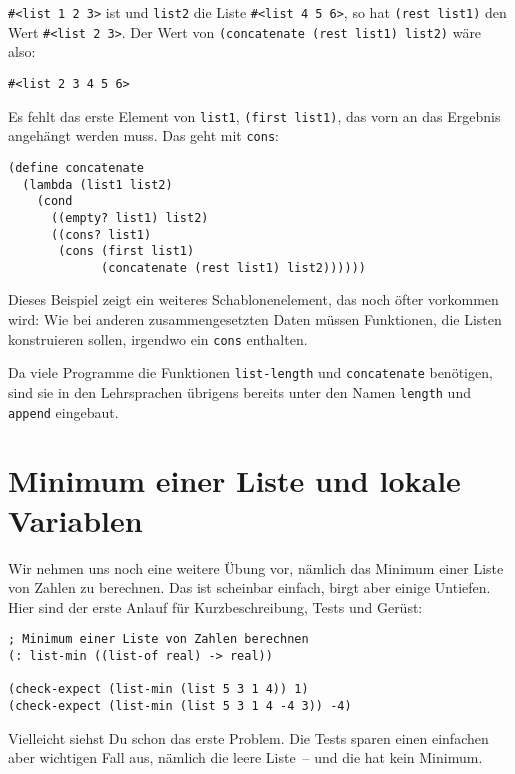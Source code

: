 \lstinline{#<list 1 2 3>} ist und \lstinline{list2} die Liste
\lstinline{#<list 4 5 6>}, so hat \lstinline{(rest list1)} den Wert \lstinline{#<list 2 3>}.
Der Wert von \lstinline{(concatenate (rest list1) list2)} wäre
also:
%
\begin{lstlisting}
#<list 2 3 4 5 6>
\end{lstlisting}
%
Es fehlt das erste Element von \lstinline{list1}, \lstinline{(first list1)}, 
das vorn an das Ergebnis angehängt werden muss.  Das geht
mit \lstinline{cons}:
%
\begin{lstlisting}
(define concatenate
  (lambda (list1 list2)
    (cond
      ((empty? list1) list2)
      ((cons? list1) 
       (cons (first list1)
             (concatenate (rest list1) list2))))))
\end{lstlisting}
%
Dieses Beispiel zeigt ein weiteres Schablonenelement, das noch öfter
vorkommen wird:  Wie bei anderen zusammengesetzten Daten müssen Funktionen, die
Listen konstruieren sollen, irgendwo ein \lstinline{cons} enthalten.

Da viele Programme die Funktionen \lstinline{list-length} und
\lstinline{concatenate} benötigen,
sind sie in den Lehrsprachen  übrigens bereits unter den Namen
\lstinline{length} und
\lstinline{append} eingebaut.


\section{Minimum einer Liste und lokale Variablen}
\label{sec:list-min}

Wir nehmen uns noch eine weitere Übung vor, nämlich das Minimum einer
Liste von Zahlen zu berechnen.  Das ist scheinbar einfach, birgt aber
einige Untiefen.  Hier sind der erste Anlauf für Kurzbeschreibung,
Tests und Gerüst:
%
\begin{lstlisting}
; Minimum einer Liste von Zahlen berechnen
(: list-min ((list-of real) -> real))

(check-expect (list-min (list 5 3 1 4)) 1)
(check-expect (list-min (list 5 3 1 4 -4 3)) -4)
\end{lstlisting}
%
Vielleicht siehst Du schon das erste Problem.  Die Tests sparen einen
einfachen aber wichtigen Fall aus, nämlich die leere Liste~-- und die
hat kein Minimum.

